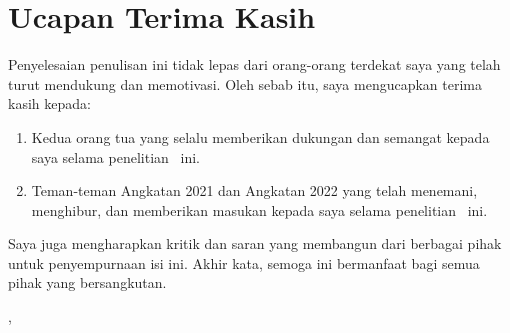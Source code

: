 \chapter*{Ucapan Terima Kasih}

Penyelesaian penulisan \MakeTextLowercase{\documentNameBahasa} ini tidak lepas dari orang-orang terdekat saya yang telah turut mendukung dan memotivasi. Oleh sebab itu, saya mengucapkan terima kasih kepada:

\begin{enumerate}
	\item Kedua orang tua yang selalu memberikan dukungan dan semangat kepada saya selama penelitian \documentNameBahasa\ ini.

	\item Teman-teman Angkatan 2021 dan Angkatan 2022 yang telah menemani, menghibur, dan memberikan masukan kepada saya selama penelitian \documentNameBahasa\ ini.
\end{enumerate}

Saya juga mengharapkan kritik dan saran yang membangun dari berbagai pihak untuk penyempurnaan isi \MakeTextLowercase{\documentNameBahasa} ini. Akhir kata, semoga \MakeTextLowercase{\documentNameBahasa} ini bermanfaat bagi semua pihak yang bersangkutan.

\vspace{2em}

\begin{flushright}
	\theCity, \theMonth\ \theYear

	\vspace{4em}

	\theAuthor
\end{flushright}
